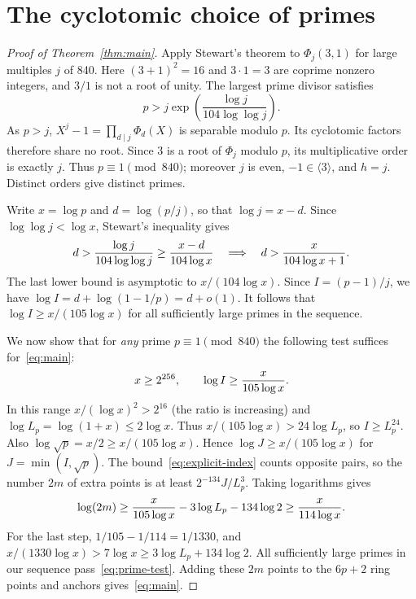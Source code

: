 \section{The cyclotomic choice of primes}\label{sec:primes}
\begin{proof}[Proof of Theorem~\ref{thm:main}] Apply Stewart's theorem \cite[Theorem 1.1, (1.7)]{stewart} to $\Phi_j(3,1)$ for large multiples $j$ of 840. Here $(3+1)^2=16$ and $3\cdot1=3$ are coprime nonzero integers, and $3/1$ is not a root of unity. The largest prime divisor satisfies
\[
 p> j\exp\!\left(\frac{\log j}{104\log\log j}\right).
\]
As $p>j$, $X^j-1=\prod_{d\mid j}\Phi_d(X)$ is separable modulo $p$. Its cyclotomic factors therefore share no root. Since $3$ is a root of $\Phi_j$ modulo $p$, its multiplicative order is exactly $j$. Thus $p\equiv1\pmod{840}$; moreover $j$ is even, $-1\in\langle3\rangle$, and $h=j$. Distinct orders give distinct primes.

Write $x=\log p$ and $d=\log(p/j)$, so that $\log j=x-d$. Since $\log\log j<\log x$, Stewart's inequality gives
\[
 \mathcopy{d > log(j)/(104 log(log(j))) >= (x-d)/(104 log x), hence d > x/(104 log x + 1).}{d>\frac{\log j}{104\log\log j}\ge\frac{x-d}{104\log x}
 \quad\Longrightarrow\quad d>\frac{x}{104\log x+1}.}
\]
The last lower bound is asymptotic to $x/(104\log x)$. Since $I=(p-1)/j$, we have $\log I=d+\log(1-1/p)=d+o(1)$. It follows that $\log I\ge x/(105\log x)$ for all sufficiently large primes in the sequence.

We now show that for \emph{any} prime $p\equiv1\pmod{840}$ the following test suffices for~\eqref{eq:main}:
\begin{equation}\label{eq:prime-test}
 \mathcopy{log(p) >= 2^256 and log(I) >= log(p)/(105 log(log(p))).}{x\ge 2^{256},\qquad \log I\ge\frac{x}{105\log x}.}
\end{equation}
In this range $x/(\log x)^2>2^{16}$ (the ratio is increasing) and $\log L_p=\log(1+x)\le2\log x$. Thus $x/(105\log x)>24\log L_p$, so $I\ge L_p^{24}$. Also $\log\sqrt p=x/2\ge x/(105\log x)$. Hence $\log J\ge x/(105\log x)$ for $J=\min(I,\sqrt p)$. The bound~\eqref{eq:explicit-index} counts opposite pairs, so the number $2m$ of extra points is at least $2^{-134}J/L_p^3$. Taking logarithms gives
\[
 \mathcopy{log(2m) >= x/(105 log x) - 3 log L_p - 134 log 2 >= x/(114 log x).}{\log(2m)\ge\frac{x}{105\log x}-3\log L_p-134\log 2
 \ge\frac{x}{114\log x}.}
\]
For the last step, $1/105-1/114=1/1330$, and $x/(1330\log x)>7\log x\ge3\log L_p+134\log 2$. All sufficiently large primes in our sequence pass~\eqref{eq:prime-test}. Adding these $2m$ points to the $6p+2$ ring points and anchors gives~\eqref{eq:main}.
\end{proof}

